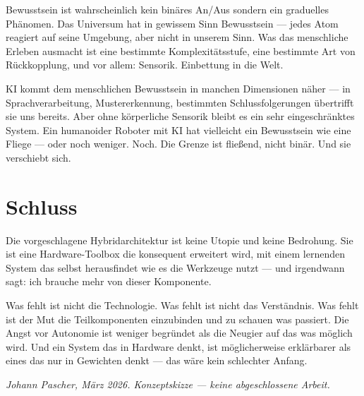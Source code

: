 \documentclass[a4paper,12pt]{article}
\begin{document}
Bewusstsein ist wahrscheinlich kein binäres An/Aus sondern ein graduelles Phänomen. Das Universum hat in gewissem Sinn Bewusstsein --- jedes Atom reagiert auf seine Umgebung, aber nicht in unserem Sinn. Was das menschliche Erleben ausmacht ist eine bestimmte Komplexitätsstufe, eine bestimmte Art von Rückkopplung, und vor allem: Sensorik. Einbettung in die Welt.

KI kommt dem menschlichen Bewusstsein in manchen Dimensionen näher --- in Sprachverarbeitung, Mustererkennung, bestimmten Schlussfolgerungen übertrifft sie uns bereits. Aber ohne körperliche Sensorik bleibt es ein sehr eingeschränktes System. Ein humanoider Roboter mit KI hat vielleicht ein Bewusstsein wie eine Fliege --- oder noch weniger. Noch. Die Grenze ist fließend, nicht binär. Und sie verschiebt sich.

\section{Schluss}

Die vorgeschlagene Hybridarchitektur ist keine Utopie und keine Bedrohung. Sie ist eine Hardware-Toolbox die konsequent erweitert wird, mit einem lernenden System das selbst herausfindet wie es die Werkzeuge nutzt --- und irgendwann sagt: ich brauche mehr von dieser Komponente.

Was fehlt ist nicht die Technologie. Was fehlt ist nicht das Verständnis. Was fehlt ist der Mut die Teilkomponenten einzubinden und zu schauen was passiert. Die Angst vor Autonomie ist weniger begründet als die Neugier auf das was möglich wird. Und ein System das in Hardware denkt, ist möglicherweise erklärbarer als eines das nur in Gewichten denkt --- das wäre kein schlechter Anfang.

\bigskip
\textit{Johann Pascher, März 2026. Konzeptskizze --- keine abgeschlossene Arbeit.}
\end{document}

